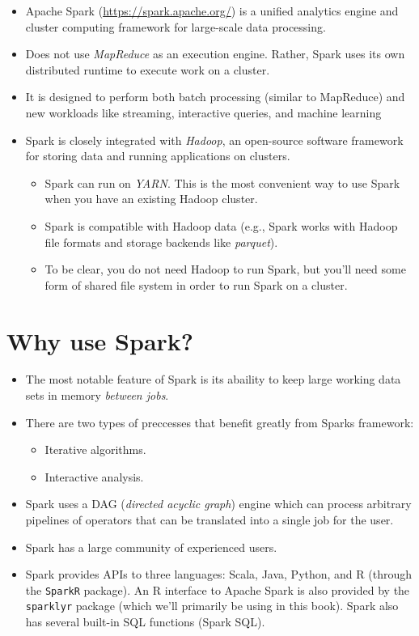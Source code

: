 \documentclass[]{book}
\theoremstyle{definition}
\theoremstyle{definition}
\theoremstyle{definition}
\theoremstyle{remark}
\begin{document}
\begin{itemize}
\item
  Apache Spark (\url{https://spark.apache.org/}) is a unified analytics
  engine and cluster computing framework for large-scale data
  processing.
\item
  Does not use \emph{MapReduce} as an execution engine. Rather, Spark
  uses its own distributed runtime to execute work on a cluster.
\item
  It is designed to perform both batch processing (similar to MapReduce)
  and new workloads like streaming, interactive queries, and machine
  learning
\item
  Spark is closely integrated with \emph{Hadoop}, an open-source
  software framework for storing data and running applications on
  clusters.

  \begin{itemize}
  \item
    Spark can run on \emph{YARN}. This is the most convenient way to use
    Spark when you have an existing Hadoop cluster.
  \item
    Spark is compatible with Hadoop data (e.g., Spark works with Hadoop
    file formats and storage backends like \emph{parquet}).
  \item
    To be clear, you do not need Hadoop to run Spark, but you'll need
    some form of shared file system in order to run Spark on a cluster.
  \end{itemize}
\end{itemize}

\hypertarget{why-use-spark}{%
\section{Why use Spark?}\label{why-use-spark}}

\begin{itemize}
\item
  The most notable feature of Spark is its abaility to keep large
  working data sets in memory \emph{between jobs}.
\item
  There are two types of preccesses that benefit greatly from Sparks
  framework:

  \begin{itemize}
  \item
    Iterative algorithms.
  \item
    Interactive analysis.
  \end{itemize}
\item
  Spark uses a DAG (\emph{directed acyclic graph}) engine which can
  process arbitrary pipelines of operators that can be translated into a
  single job for the user.
\item
  Spark has a large community of experienced users.
\item
  Spark provides APIs to three languages: Scala, Java, Python, and R
  (through the \texttt{SparkR} package). An R interface to Apache Spark
  is also provided by the \texttt{sparklyr} package (which we'll
  primarily be using in this book). Spark also has several built-in SQL
  functions (Spark SQL).
\end{itemize}
\end{document}
